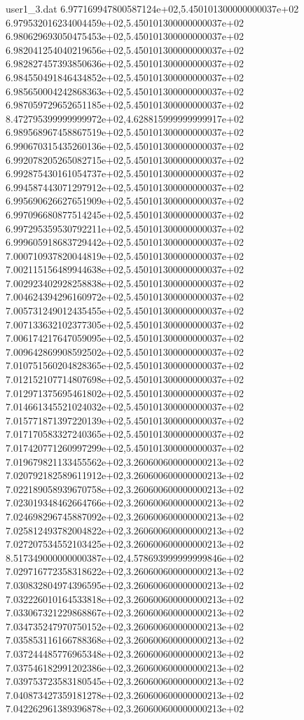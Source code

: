 \begin{filecontents}{user1_3.dat}
6.977169947800587124e+02,5.450101300000000037e+02
6.979532016234004459e+02,5.450101300000000037e+02
6.980629693050475453e+02,5.450101300000000037e+02
6.982041254040219656e+02,5.450101300000000037e+02
6.982827457393850636e+02,5.450101300000000037e+02
6.984550491846434852e+02,5.450101300000000037e+02
6.985650004242868363e+02,5.450101300000000037e+02
6.987059729652651185e+02,5.450101300000000037e+02
8.472795399999999972e+02,4.628815999999999917e+02
6.989568967458867519e+02,5.450101300000000037e+02
6.990670315435260136e+02,5.450101300000000037e+02
6.992078205265082715e+02,5.450101300000000037e+02
6.992875430161054737e+02,5.450101300000000037e+02
6.994587443071297912e+02,5.450101300000000037e+02
6.995690626627651909e+02,5.450101300000000037e+02
6.997096680877514245e+02,5.450101300000000037e+02
6.997295359530792211e+02,5.450101300000000037e+02
6.999605918683729442e+02,5.450101300000000037e+02
7.000710937820044819e+02,5.450101300000000037e+02
7.002115156489944638e+02,5.450101300000000037e+02
7.002923402928258838e+02,5.450101300000000037e+02
7.004624394296160972e+02,5.450101300000000037e+02
7.005731249012435455e+02,5.450101300000000037e+02
7.007133632102377305e+02,5.450101300000000037e+02
7.006174217647059095e+02,5.450101300000000037e+02
7.009642869908592502e+02,5.450101300000000037e+02
7.010751560204828365e+02,5.450101300000000037e+02
7.012152107714807698e+02,5.450101300000000037e+02
7.012971375695461802e+02,5.450101300000000037e+02
7.014661345521024032e+02,5.450101300000000037e+02
7.015771871397220139e+02,5.450101300000000037e+02
7.017170583327240365e+02,5.450101300000000037e+02
7.017420771260997299e+02,5.450101300000000037e+02
7.019679821133455562e+02,3.260600600000000213e+02
7.020792182589611912e+02,3.260600600000000213e+02
7.022189058939670758e+02,3.260600600000000213e+02
7.023019348462664766e+02,3.260600600000000213e+02
7.024698296745887092e+02,3.260600600000000213e+02
7.025812493782004822e+02,3.260600600000000213e+02
7.027207534552103425e+02,3.260600600000000213e+02
8.517349000000000387e+02,4.578693999999999846e+02
7.029716772358318622e+02,3.260600600000000213e+02
7.030832804974396595e+02,3.260600600000000213e+02
7.032226010164533818e+02,3.260600600000000213e+02
7.033067321229868867e+02,3.260600600000000213e+02
7.034735247970750152e+02,3.260600600000000213e+02
7.035853116166788368e+02,3.260600600000000213e+02
7.037244485776965348e+02,3.260600600000000213e+02
7.037546182991202386e+02,3.260600600000000213e+02
7.039753723583180545e+02,3.260600600000000213e+02
7.040873427359181278e+02,3.260600600000000213e+02
7.042262961389396878e+02,3.260600600000000213e+02

\end{filecontents}
